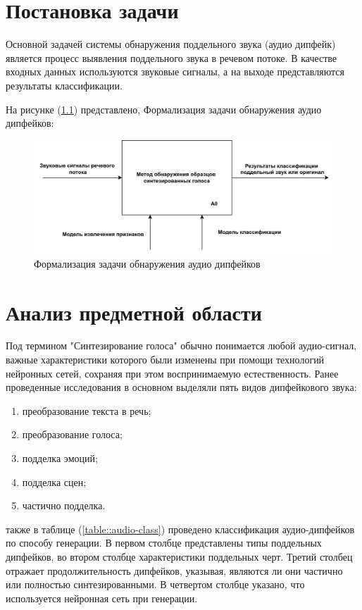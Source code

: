 \chapter{Постановка задачи}

Основной задачей системы обнаружения поддельного звука (аудио дипфейк) является процесс выявления поддельного звука в речевом потоке. В качестве входных данных используются звуковые сигналы, а на выходе представляются результаты классификации.

На рисунке (\ref{fig:method-desc}) представлено, Формализация задачи обнаружения аудио дипфейков: 
\begin{figure}[H]
	\centering
	\includegraphics[width=1\linewidth]{images/idef0.png}
	\caption{Формализация задачи обнаружения аудио дипфейков}
	\label{fig:method-desc}
\end{figure}


\vspace{12pt}
{\let\clearpage\relax \chapter{Анализ предметной области}}

Под термином "Синтезирование голоса" обычно понимается любой аудио-сигнал, важные характеристики которого были изменены при помощи технологий нейронных сетей, сохраняя при этом воспринимаемую естественность. Ранее проведенные исследования в основном выделяли пять видов дипфейкового звука:

\begin{enumerate}
    \item преобразование текста в речь;
    \item преобразование голоса; 
    \item подделка эмоций;
    \item подделка сцен;
    \item частично подделка.
\end{enumerate}

также в таблице (\ref{table::audio-class}) проведено классификация аудио-дипфейков по способу генерации. В первом столбце представлены типы поддельных дипфейков, во втором столбце характеристики поддельных черт. Третий столбец отражает продолжительность дипфейков, указывая, являются ли они частично или полностью синтезированными. В четвертом столбце указано, что используется нейронная сеть при генерации.

